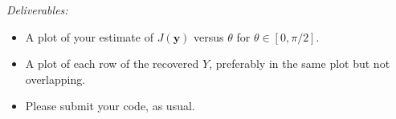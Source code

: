 \documentclass{abernethy_hw}
\newcommand{\y}{\mathbf{y}}
\begin{document}
{\emph{Deliverables:}
\begin{itemize}
    \setlength{\leftskip}{\probmargin}
	\addtolength{\leftskip}{\probmargin}
    \item A plot of your estimate of $J(\y)$ versus $\theta$ for $\theta \in [0,\pi/2]$.
    \item A plot of each row of the recovered $Y$, preferably in the same plot but not overlapping.
    \item Please submit your code, as usual.
\end{itemize}
}



\end{document}

